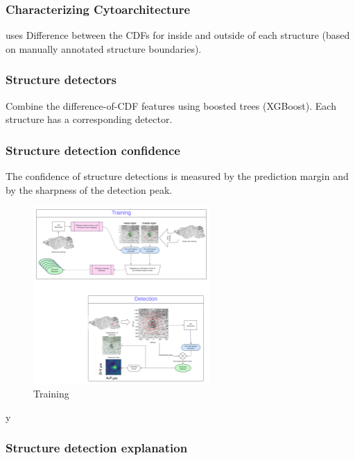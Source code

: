 \documentclass[runningheads]{llncs}
\begin{document}
      \subsubsection{ Characterizing Cytoarchitecture} uses Difference between the CDFs for inside and outside of each structure (based on manually annotated structure boundaries). 
\subsubsection { Structure detectors} Combine the difference-of-CDF
features using boosted trees (XGBoost). Each structure has a
corresponding detector.

\subsubsection { Structure detection confidence} The confidence of structure
  detections is measured by the prediction margin and by the sharpness
  of the detection peak.
\begin{figure}
\centering
\includegraphics[width=0.6\textwidth]{figures/Training.pdf}
\caption{Training \label{fig:training}}
\end{figure}
y
\subsubsection { Structure detection explanation}

\end{document}
